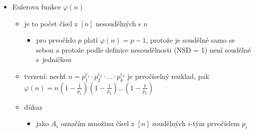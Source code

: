 \begin{itemize}
\begin{itemize}
\begin{itemize}
\item musíme vyjádřit velikosti průniků
\begin{itemize}
\item permutací s (konkrétními) $k$ pevnými body je $(n-k)!$, protože permutuji všechny prvky kromě těch pevných
\end{itemize}
\item dosazením do principu inkluze a exkluze vyjde $|A|=\sum_{k=1}^n(-1)^{k+1}{n\choose k}(n-k)!$
\begin{itemize}
\item $n\choose k$ vyplývá z počtu prvků druhé sumy
\item ${n\choose k}(n-k)!={n!\over k!}$
\end{itemize}
\item $|A|=\sum_{k=1}^n(-1)^{k+1}\frac{n!}{k!}=n!\cdot\sum_{k=1}^n{(-1)^{k+1}\over k!}$
\item $|A|=n!({1\over 1!}-{1\over 2!}+{1\over 3!}-\dots+{(-1)^{n+1}\over n!})$
\item $\text{š}(n)=n!-|A|=n!\cdot(1-{1\over 1!}+{1\over 2!}-{1\over 3!}+\dots+{(-1)^n\over n!})$
\begin{itemize}
\item závorka konverguje k $e^{-1}$
\item závorka odpovídá pravděpodobnosti v problému šatnářky
\end{itemize}
\item $\text{š}(n)=n!\cdot\sum_{k=0}^n\frac{(-1)^k}{k!}$
\item pravděpodobnost \dots{} $\sum_{k=0}^n\frac{(-1)^k}{k!}\approx e^{-1}$
\end{itemize}
\item Eulerova funkce $\varphi(n)$
\begin{itemize}
\item je to počet čísel z $[n]$ nesoudělných s $n$
\begin{itemize}
\item pro prvočíslo $p$ platí $\varphi(n)=p-1$, protože je soudělné samo se sebou a protože podle definice nesoudělnosti (NSD = 1) není soudělné s~jedničkou
\end{itemize}
\item tvrzení: nechť $n=p_1^{e_1}\cdot p_2^{e_2}\cdot\ldots\cdot p_k^{e_k}$ je prvočíselný rozklad, pak $\varphi(n)=n(1-\frac{1}{p_1})(1-\frac1{p_2})\dots(1-\frac1{p_k})$
\item důkaz
\begin{itemize}
\item jako $A_i$ označím množinu čísel z $[n]$ soudělných $i$-tým prvočíslem $p_i$

\end{itemize}
\end{itemize}
\end{itemize}
\end{itemize}
